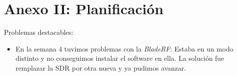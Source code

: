 \documentclass[10pt,a4paper,titlepage]{report}
\begin{document}
\chapter*{Anexo II: Planificación}
	Problemas destacables:
	\begin{itemize}
	\item En la semana 4 tuvimos problemas con la \textit{BladeRF}: Estaba en un modo distinto y no conseguimos instalar el software en ella. La solución fue remplazar la SDR por otra nueva y ya pudimos avanzar.
	\end{itemize}
	
	



\end{document}
